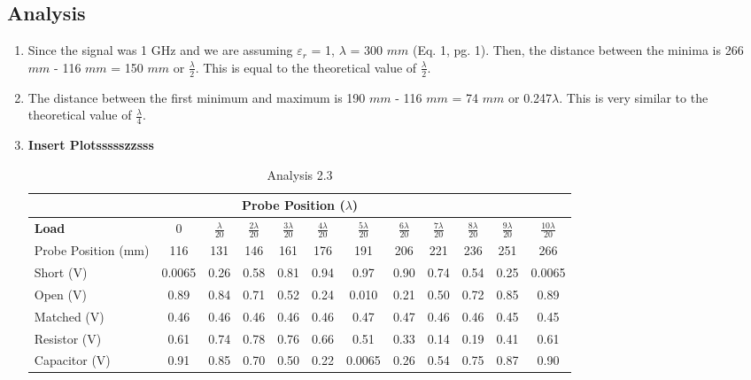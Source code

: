 \documentclass{article}
\begin{document}
\subsection{Analysis}
\begin{enumerate}
	\item Since the signal was 1 GHz and we are assuming $\varepsilon_r$ = 1, $\lambda$ = 300 $mm$ (Eq. 1, pg. 1). Then, the distance between the minima is 266 $mm$ - 116 $mm$ = 150 $mm$ or $\frac{\lambda}{2}$. This is equal to the theoretical value of $\frac{\lambda}{2}$.
	
	\item The distance between the first minimum and maximum is 190 $mm$ - 116 $mm$ = 74 $mm$ or 0.247$\lambda$. This is very similar to the theoretical value of $\frac{\lambda}{4}$.
	
	\item \textbf{Insert Plotssssszzsss}
	\begin{table}[h]
	\centering
		\begin{tabular}{|l|c|c|c|c|c|c|c|c|c|c|c|}
		\hline
		\multicolumn{12}{|c|}{\textbf{Probe Position ($\lambda$)}}                                                         		\\ \hline
		\textbf{Load}       & 0      & $\frac{\lambda}{20}$    & $\frac{2\lambda}{20}$    & $\frac{3\lambda}{20}$    & $\frac{4\lambda}{20}$    & $\frac{5\lambda}{20}$      & $\frac{6\lambda}{20}$    & $\frac{7\lambda}{20}$    & $\frac{8\lambda}{20}$    & $\frac{9\lambda}{20}$    & $\frac{10\lambda}{20}$     		\\ \hline
		Probe Position (mm) & 116    & 131  & 146  & 161  & 176  & 191    & 206  & 221  & 236  & 251  & 266    		\\ \hline
		Short (V)           & 0.0065 & 0.26 & 0.58 & 0.81 & 0.94 & 0.97   & 0.90 & 0.74 & 0.54 & 0.25 & 0.0065 		\\ \hline
		Open (V)            & 0.89   & 0.84 & 0.71 & 0.52 & 0.24 & 0.010  & 0.21 & 0.50 & 0.72 & 0.85 & 0.89   		\\ \hline
		Matched (V)         & 0.46   & 0.46 & 0.46 & 0.46 & 0.46 & 0.47   & 0.47 & 0.46 & 0.46 & 0.45 & 0.45   		\\ \hline
		Resistor (V)        & 0.61   & 0.74 & 0.78 & 0.76 & 0.66 & 0.51   & 0.33 & 0.14 & 0.19 & 0.41 & 0.61   		\\ \hline
		Capacitor (V)       & 0.91   & 0.85 & 0.70 & 0.50 & 0.22 & 0.0065 & 0.26 & 0.54 & 0.75 & 0.87 & 0.90   		\\ \hline
		\end{tabular}
		\caption{Analysis 2.3}
		\label{}
	\end{table}
\end{enumerate}
\end{document}
